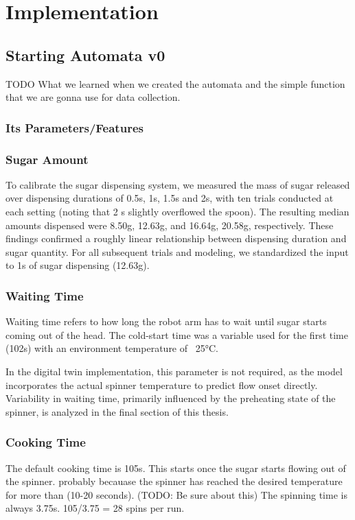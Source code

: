 \chapter{Implementation}
\label{sec:implementation}

\section{Starting Automata v0}
TODO What we learned when we created the automata and the simple function that we are gonna use for data collection.
\subsection{Its Parameters/Features}


\subsection{Sugar Amount}\label{subsec:sugar-amount}
To calibrate the sugar dispensing system, we measured the mass of sugar released over dispensing durations of 0.5s, 1s, 1.5s and 2s, with ten trials conducted at each setting (noting that 2 s slightly overflowed the spoon). The resulting median amounts dispensed were 8.50g, 12.63g, and 16.64g, 20.58g, respectively. These findings confirmed a roughly linear relationship between dispensing duration and sugar quantity. For all subsequent trials and modeling, we standardized the input to 1s of sugar dispensing (12.63g).

\subsection{Waiting Time}
Waiting time refers to how long the robot arm has to wait until sugar starts coming out of the head. The cold-start time was a variable used for the first time (102s) with an environment temperature of ~25°C. 

In the digital twin implementation, this parameter is not required, as the model incorporates the actual spinner temperature to predict flow onset directly. Variability in waiting time, primarily influenced by the preheating state of the spinner, is analyzed in the final section of this thesis.

\subsection{Cooking Time}
The default cooking time is 105s. This starts once the sugar starts flowing out of the spinner. probably becauase the spinner has reached the desired temperature for more than (10-20 seconds). (TODO: Be sure about this)
The spinning time is always 3.75s.
105/3.75 = 28 spins per run.


